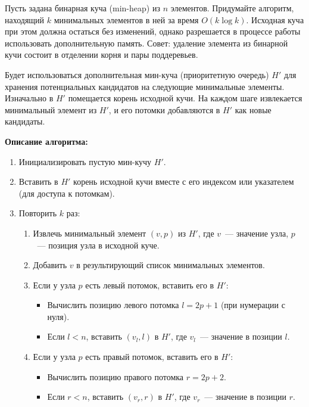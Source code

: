 \documentclass[11pt]{article}
\begin{document}
\begin{problem}{25}
Пусть задана бинарная куча (min-heap) из $n$ элементов. Придумайте алгоритм, находящий $k$ минимальных элементов в ней за время $O(k \log k)$.
Исходная куча при этом должна остаться без изменений, однако разрешается в процессе работы использовать дополнительную память.
Совет: удаление элемента из бинарной кучи состоит в отделении корня и пары поддеревьев.
\end{problem}

\begin{solution}
    Будет использоваться дополнительная мин-куча (приоритетную очередь) $H'$ для хранения потенциальных кандидатов на следующие минимальные элементы. Изначально в $H'$ помещается корень исходной кучи. На каждом шаге извлекается минимальный элемент из $H'$, и его потомки добавляются в $H'$ как новые кандидаты.

    \textbf{Описание алгоритма:}

    \begin{enumerate}
        \item Инициализировать пустую мин-кучу $H'$.
        \item Вставить в $H'$ корень исходной кучи вместе с его индексом или указателем (для доступа к потомкам).
        \item Повторить $k$ раз:
              \begin{enumerate}
                  \item Извлечь минимальный элемент $(v, p)$ из $H'$, где $v$~--- значение узла, $p$~--- позиция узла в исходной куче.
                  \item Добавить $v$ в результирующий список минимальных элементов.
                  \item Если у узла $p$ есть левый потомок, вставить его в $H'$:
                        \begin{itemize}
                            \item Вычислить позицию левого потомка $l = 2p + 1$ (при нумерации с нуля).
                            \item Если $l < n$, вставить $(v_l, l)$ в $H'$, где $v_l$~--- значение в позиции $l$.
                        \end{itemize}
                  \item Если у узла $p$ есть правый потомок, вставить его в $H'$:
                        \begin{itemize}
                            \item Вычислить позицию правого потомка $r = 2p + 2$.
                            \item Если $r < n$, вставить $(v_r, r)$ в $H'$, где $v_r$~--- значение в позиции $r$.
                        \end{itemize}
              \end{enumerate}
    \end{enumerate}


\end{solution}
\end{document}
